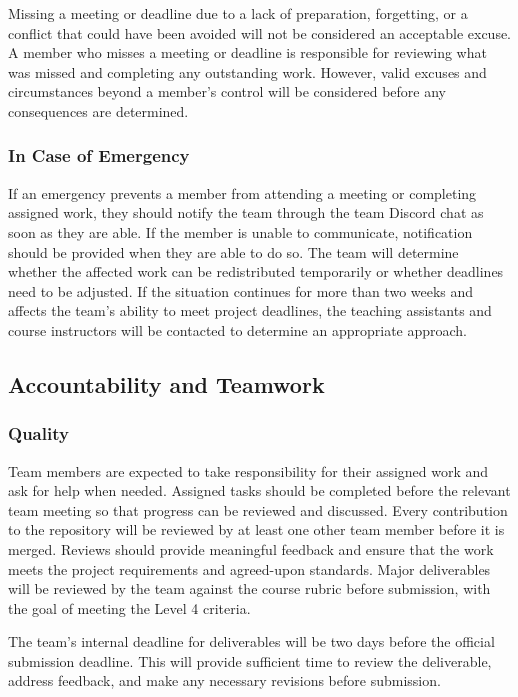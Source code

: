 \documentclass{article}
\begin{document}
Missing a meeting or deadline due to a lack of preparation, forgetting, or a conflict that
could have been avoided will not be considered an acceptable excuse. A member who misses a
meeting or deadline is responsible for reviewing what was missed and completing any outstanding work.
However, valid excuses and circumstances beyond a member's control will be considered before
any consequences are determined.

\subsubsection*{In Case of Emergency}

If an emergency prevents a member from attending a meeting or completing assigned work,
they should notify the team through the team Discord chat as soon as they are able. If the member
is unable to communicate, notification should be provided when they are able to do so. The
team will determine whether the affected work can be redistributed temporarily or whether
deadlines need to be adjusted. If the situation continues for more than two weeks and
affects the team's ability to meet project deadlines, the teaching assistants and course
instructors will be contacted to determine an appropriate approach.

\subsection*{Accountability and Teamwork}

\subsubsection*{Quality}

Team members are expected to take responsibility for their assigned work and ask for help when needed.
Assigned tasks should be completed before the relevant team meeting so that progress can be reviewed
and discussed. Every contribution to the repository will be reviewed by at least one other team member
before it is merged. Reviews should provide meaningful feedback and ensure that the work meets the project
requirements and agreed-upon standards. Major deliverables will be reviewed by the team against the course
rubric before submission, with the goal of meeting the Level 4 criteria.

The team's internal deadline for deliverables will be two days before the official submission deadline.
This will provide sufficient time to review the deliverable, address feedback, and make any necessary
revisions before submission.
\end{document}
